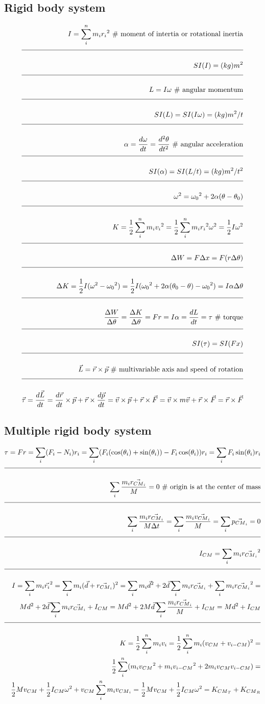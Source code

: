 \documentclass[a4paper]{article}
\newcommand{\eqComment}[1]{\text{  \# #1}}
\newcommand{\n}{\\[1.5ex] \hline \nonumber \\[0ex]}
\newcommand{\m}{\nonumber \\}
\begin{document}
\subsection{Rigid body system}
\begin{tcolorbox}
\begin{align}
   I = \sum_i^n m_i {r_i}^2 \eqComment{moment of intertia or rotational inertia}
\n SI(I) = (kg) m^2
\n L = I \omega \eqComment{angular momentum}
\n SI(L) = SI(I \omega) = (kg) m^2 / t
\n \alpha = \frac{d\omega}{dt} = \frac{d^2\theta}{dt^2} \eqComment{angular acceleration}
\n SI(\alpha) = SI(L / t) = (kg) m^2 / t^2
\n \omega^2 = {\omega_0}^2 + 2 \alpha(\theta - \theta_0)
\n K = \frac{1}{2} \sum_i^n m_i {v_i}^2 = \frac{1}{2} \sum_i^n m_i {r_i}^2 \omega^2 = \frac{1}{2} I \omega^2 
\n \Delta W = F \Delta x = F (r \Delta \theta)
\n \Delta K = \frac{1}{2} I(\omega^2 - {\omega_0}^2) = \frac{1}{2} I({\omega_0}^2 + 2 \alpha(\theta_0 - \theta) - {\omega_0}^2) = I \alpha \Delta \theta
\n \frac{\Delta W}{\Delta \theta} = \frac{\Delta K}{\Delta \theta} = F r = I \alpha = \frac{dL}{dt} = \tau \eqComment{torque}
\n SI(\tau) = SI(F x)
\n \vec{L} = \vec{r} \times \vec{p} \eqComment{multivariable axis and speed of rotation}
\n \vec{\tau} = \frac{d\vec{L}}{dt} = \frac{d\vec{r}}{dt} \times \vec{p} + \vec{r} \times \frac{d\vec{p}}{dt} = \vec{v} \times \vec{p} + \vec{r} \times \vec{F} = \vec{v} \times m \vec{v} + \vec{r} \times \vec{F} = \vec{r} \times \vec{F}
\end{align}
\end{tcolorbox}

\subsection{Multiple rigid body system}
\begin{tcolorbox}
\begin{align}
   \tau = F r = \sum_i (F_i - N_i) r_i = \sum_i (F_i (\cos(\theta_i) + \sin(\theta_i)) - F_i \cos(\theta_i)) r_i = \sum_i F_i \sin(\theta_i) r_i
\n \sum_i \frac{m_i \vec{r_{{CM}_i}}}{M} = 0 \eqComment{origin is at the center of mass}
\n \sum_i \frac{m_i \vec{r_{{CM}_i}}}{M \Delta t} = \sum_i \frac{m_i \vec{v_{{CM}_i}}}{M} = \sum_i \vec{p_{{CM}_i}} = 0
\n I_{CM} = \sum_i m_i \vec{r_{{CM}_i}}^2
\n I = \sum_i m_i \vec{r_i}^2 = \sum_i m_i (\vec{d} + \vec{r_{{CM}_i}})^2 = \sum_i m_i \vec{d}^2 + 2 \vec{d} \sum_i m_i \vec{r_{{CM}_i}} + \sum_i m_i \vec{r_{{CM}_i}}^2 =
\m M d^2 + 2 \vec{d} \sum_i m_i \vec{r_{{CM}_i}} + I_{CM} = M d^2 + 2 M \vec{d} \sum_i \frac{m_i \vec{r_{{CM}_i}}}{M} + I_{CM} = M d^2 + I_{CM}
\n K = \frac{1}{2} \sum_i^n m_i v_i = \frac{1}{2} \sum_i^n m_i (v_{CM} + v_{i-CM})^2 = 
\m \frac{1}{2} \sum_i^n (m_i {v_{CM}}^2 + m_i {v_{i-CM}}^2 + 2 m_i v_{CM} v_{i-CM}) = 
\m \frac{1}{2} M v_{CM} + \frac{1}{2} I_{CM} \omega^2 + v_{CM} \sum_i^n m_i v_{{CM}_i} = \frac{1}{2} M v_{CM} + \frac{1}{2} I_{CM} \omega^2 = K_{{CM}_T} + K_{{CM}_R}
\end{align}
\end{tcolorbox}
\end{document}
